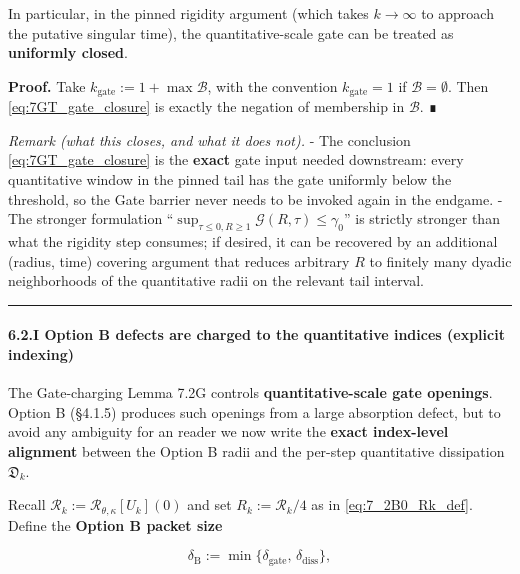 \documentclass[
  11pt,
]{article}
\begin{document}
In particular, in the pinned rigidity argument (which takes \(k\to\infty\) to approach the putative singular time), the quantitative-scale gate can be treated as \textbf{uniformly closed}.

\textbf{Proof.} Take \(k_{\mathrm{gate}}:=1+\max\mathcal B\), with the convention \(k_{\mathrm{gate}}=1\) if \(\mathcal B=\emptyset\). Then \eqref{eq:7GT_gate_closure} is exactly the negation of membership in \(\mathcal B\). ∎

\emph{Remark (what this closes, and what it does not).} - The conclusion \eqref{eq:7GT_gate_closure} is the \textbf{exact} gate input needed downstream: every quantitative window in the pinned tail has the gate uniformly below the threshold, so the Gate barrier never needs to be invoked again in the endgame. - The stronger formulation ``\(\sup_{\tau\le0,R\ge1}\mathcal G(R,\tau)\le\gamma_0\)'' is strictly stronger than what the rigidity step consumes; if desired, it can be recovered by an additional (radius, time) covering argument that reduces arbitrary \(R\) to finitely many dyadic neighborhoods of the quantitative radii on the relevant tail interval.

\begin{center}\rule{0.5\linewidth}{0.5pt}\end{center}

\hypertarget{i-option-b-defects-are-charged-to-the-quantitative-indices-explicit-indexing}{%
\paragraph{6.2.I Option B defects are charged to the quantitative indices (explicit indexing)}\label{i-option-b-defects-are-charged-to-the-quantitative-indices-explicit-indexing}}

The Gate-charging Lemma 7.2G controls \textbf{quantitative-scale gate openings}. Option B (§4.1.5) produces such openings from a large absorption defect, but to avoid any ambiguity for an reader we now write the \textbf{exact index-level alignment} between the Option B radii and the per-step quantitative dissipation \(\mathfrak D_k\).

Recall \(\mathcal R_k:=\mathcal R_{\theta,\kappa}[U_k](0)\) and set \(R_k:=\mathcal R_k/4\) as in \eqref{eq:7_2B0_Rk_def}. Define the \textbf{Option B packet size}

\begin{equation}
\delta_{\mathrm{B}}
:=\min\{\delta_{\mathrm{gate}},\,\delta_{\mathrm{diss}}\},
\tag{7.2B1}\label{eq:7_2B1_deltaB_def}
\end{equation}
\end{document}

